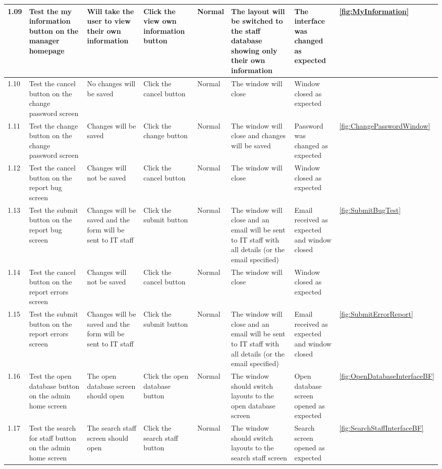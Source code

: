 \begin{landscape}
\begin{center}
\begin{longtable}{|p{1.5cm}|p{2cm}|p{2.5cm}|p{2cm}|p{2cm}|p{2cm}|p{3cm}|p{1.7cm}|}
1.09 & Test the my information button on the manager homepage & Will take the user to view their own information & Click the view own information button& Normal  & The layout will be switched to the staff database showing only their own information &The interface was changed as expected&   \ref {fig:MyInformation} \\ \hline
1.10 & Test the cancel button on the change password screen & No changes will be saved & Click the cancel button & Normal & The window will close & Window closed as expected&  \\ \hline
1.11 & Test the change button on the change password screen & Changes will be saved & Click the change button & Normal & The window will close and changes will be saved&Password was changed as expected& \ref{fig:ChangePasswordWindow}\\ \hline
1.12 & Test the cancel button on the report bug screen & Changes will not be saved & Click the cancel button & Normal & The window will close&Window closed as expected& \\ \hline
1.13 & Test the submit button on the report bug screen & Changes will be saved and the form will be sent to IT staff & Click the submit button& Normal  & The window will close and an email will be sent to IT staff with all details (or the email specified) &Email received as expected and window closed &  \ref {fig:SubmitBugTest} \\ \hline
1.14 & Test the cancel button on the report errors screen & Changes will not be saved & Click the cancel button & Normal & The window will close& Window closed as expected& \\ \hline
1.15 & Test the submit button on the report errors screen & Changes will be saved and the form will be sent to IT staff & Click the submit button& Normal  & The window will close and an email will be sent to IT staff with all details (or the email specified) &Email received as expected and window closed & \ref {fig:SubmitErrorReport} \\ \hline
1.16 & Test the open database button on the admin home screen & The open database screen should open & Click the open database button& Normal  & The window should switch layouts to the open database screen &Open database screen opened as expected&\ref {fig:OpenDatabaseInterfaceBF} \\ \hline
1.17 & Test the search for staff button on the admin home screen & The search staff screen should open & Click the search staff button& Normal  & The window should switch layouts to the search staff screen & Search screen opened as expected&\ref {fig:SearchStaffInterfaceBF}  \\ \hline

\end{longtable}
\end{center}
\end{landscape}
